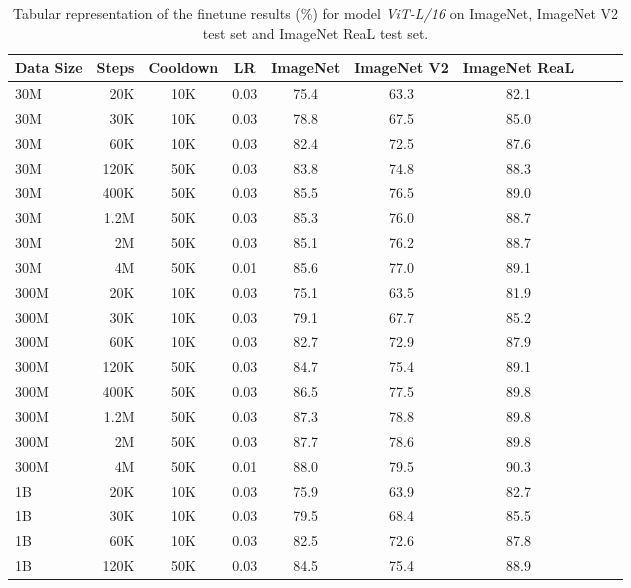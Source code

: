 \begin{table}[h]
  \setlength{\tabcolsep}{5pt}
  \setlength{\extrarowheight}{5pt}
  \renewcommand{\arraystretch}{0.75}
  \centering
  \caption{Tabular representation of the finetune results (\%) for model \emph{ViT-L/16} on ImageNet, ImageNet V2 test set and ImageNet ReaL test set.}\label{tbl:l_16_ft}
  \begin{tabulary}{1.0\textwidth}{l r c c c c c c c c}
    \toprule[1pt]
    \bf{Data Size} & \bf{Steps} & \bf{Cooldown} & \bf{LR} & \bf{ImageNet} & \bf{ImageNet V2} & \bf{ImageNet ReaL} \\
    \midrule
30M   & 20K   & 10K   & 0.03 & 75.4 & 63.3 & 82.1 \\
30M   & 30K   & 10K   & 0.03 & 78.8 & 67.5 & 85.0 \\
30M   & 60K   & 10K   & 0.03 & 82.4 & 72.5 & 87.6 \\
30M   & 120K  & 50K   & 0.03 & 83.8 & 74.8 & 88.3 \\
30M   & 400K  & 50K   & 0.03 & 85.5 & 76.5 & 89.0 \\
30M   & 1.2M  & 50K   & 0.03 & 85.3 & 76.0 & 88.7 \\
30M   & 2M    & 50K   & 0.03 & 85.1 & 76.2 & 88.7 \\
30M   & 4M    & 50K   & 0.01 & 85.6 & 77.0 & 89.1 \\
\midrule[0.25pt]
300M  & 20K   & 10K   & 0.03 & 75.1 & 63.5 & 81.9 \\
300M  & 30K   & 10K   & 0.03 & 79.1 & 67.7 & 85.2 \\
300M  & 60K   & 10K   & 0.03 & 82.7 & 72.9 & 87.9 \\
300M  & 120K  & 50K   & 0.03 & 84.7 & 75.4 & 89.1 \\
300M  & 400K  & 50K   & 0.03 & 86.5 & 77.5 & 89.8 \\
300M  & 1.2M  & 50K   & 0.03 & 87.3 & 78.8 & 89.8 \\
300M  & 2M    & 50K   & 0.03 & 87.7 & 78.6 & 89.8 \\
300M  & 4M    & 50K   & 0.01 & 88.0 & 79.5 & 90.3 \\
\midrule[0.25pt]
1B    & 20K   & 10K   & 0.03 & 75.9 & 63.9 & 82.7 \\
1B    & 30K   & 10K   & 0.03 & 79.5 & 68.4 & 85.5 \\
1B    & 60K   & 10K   & 0.03 & 82.5 & 72.6 & 87.8 \\
1B    & 120K  & 50K   & 0.03 & 84.5 & 75.4 & 88.9 \\

\end{tabulary}
\end{table}
